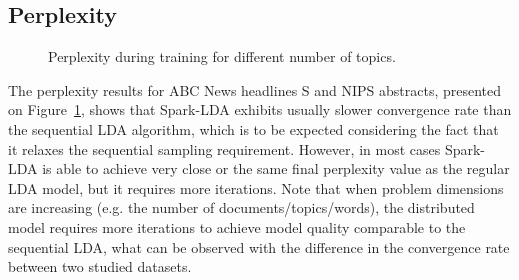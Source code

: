 \documentclass[journal]{IEEEtran}
\begin{document}
\subsection{Perplexity}
\begin{figure}[t]
\centering
{}
\caption{Perplexity during training for different number of topics.}
\label{fig:sim}
\end{figure}
The perplexity results for ABC News headlines S and NIPS abstracts, presented on Figure~\ref{fig:sim}, shows that Spark-LDA exhibits usually slower convergence rate than the sequential LDA algorithm, which is to be expected considering the fact that it relaxes the sequential sampling requirement. However, in most cases Spark-LDA is able to achieve very close or the same final perplexity value as the regular LDA model, but it requires more iterations. Note that when problem dimensions are increasing (e.g. the number of documents/topics/words), the distributed model requires more iterations to achieve model quality comparable to the sequential LDA, what can be observed with the difference in the convergence rate between two studied datasets.
\end{document}
